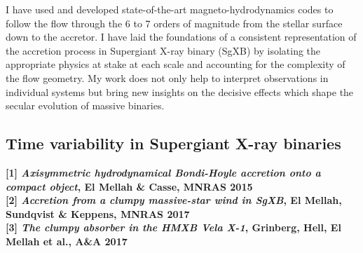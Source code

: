 \documentclass[letterpaper,12pt,onecolumn]{article}
\makeatletter
\newcommand{\sgx}{SgXB\xspace}
\newcommand*{\hmxb}{HMXB\@\xspace}
\makeatother
\begin{document}
I have used and developed state-of-the-art magneto-hydrodynamics codes to follow the flow through the 6 to 7 orders of magnitude from the stellar surface down to the accretor. I have laid the foundations of a consistent representation of the accretion process in Supergiant X-ray binary (\sgx) by isolating the appropriate physics at stake at each scale and accounting for the complexity of the flow geometry. My work does not only help to interpret observations in individual systems but bring new insights on the decisive effects which shape the secular evolution of massive binaries.


\subsection*{Time variability in Supergiant X-ray binaries}

\footnotesize
\textbf{[1] \textit{Axisymmetric hydrodynamical Bondi-Hoyle accretion onto a compact object}, El Mellah \& Casse, MNRAS 2015}\\
\textbf{[2] \textit{Accretion from a clumpy massive-star wind in SgXB}, El Mellah, Sundqvist \& Keppens, MNRAS 2017}\\
\textbf{[3] \textit{The clumpy absorber in the HMXB Vela X-1}, Grinberg, Hell, El Mellah et al., A\&A 2017}\\

\normalsize

\end{document}
